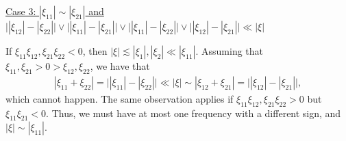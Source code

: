 \documentclass[%
11pt,  reqno]{amsart}
\newcommand{\5}{\textup{V}}
\newcommand{\noi}{\noindent}
\newcommand{\les}{\lesssim}
\theoremstyle{remark}
\numberwithin{equation}{section}
\numberwithin{theorem}{section}
\begin{document}
\smallskip
\noi
\underline{Case 3: $|\xi_{11}| \sim |\xi_{21}|$ and $\big| |\xi_{12}| - |\xi_{22}| \big| \lor \big| |\xi_{11}| - |\xi_{21}| \big| \lor \big| |\xi_{11}| - |\xi_{22}| \big| \lor \big| |\xi_{12}| - |\xi_{21}| \big|\ll |\xi| $}


If $\xi_{11} \xi_{12}, \xi_{21}\xi_{22}<0$, then $|\xi| \les |\xi_1|, |\xi_2|\ll |\xi_{11}|$. Assuming that $\xi_{11},\xi_{21}>0 > \xi_{12}, \xi_{22} $, we have that
\begin{align}
    |\xi_{11} + \xi_{22} | = \big| |\xi_{11}| - |\xi_{22}| \big| 
    \ll |\xi| \sim |\xi_{12} + \xi_{21}| = \big| |\xi_{12}| - |\xi_{21}| \big|, 
\end{align}
which cannot happen.
The same observation applies if $\xi_{11}\xi_{12}, \xi_{21}\xi_{22}>0$ but $\xi_{11}\xi_{21}<0$. 
Thus, we must have at most one frequency with a different sign, and $|\xi| \sim |\xi_{11}|$. 
\end{document}
